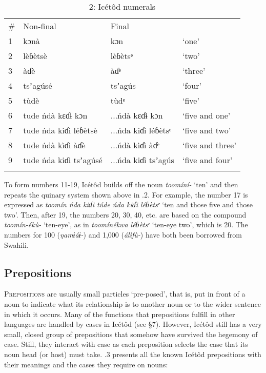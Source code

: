 \begin{table}
\caption{2: Icétôd numerals}
\label{tab:3}


\begin{tabularx}{\textwidth}{XXXX}
\lsptoprule

\# & Non-final & Final & \\
1 & kɔnà & kɔn & ‘one’\\
2 & lèɓètsè & lèɓètsᵉ & ‘two’\\
3 & àɗè & àɗᵉ & ‘three’\\
4 & tsʼagúsé & tsʼagús & ‘four’\\
5 & tùdè & tùdᵉ & ‘five’\\
6 & tude ńdà kɛɗɨ kɔn & ...ńdà kɛɗɨ kɔn & ‘five and one’\\
7 & tude ńda kiɗi léɓètsè & ...ńda kiɗi léɓètsᵉ & ‘five and two’\\
8 & tude ńdà kìɗì àɗè & ...ńdà kìɗì àɗᵉ & ‘five and three’\\
9 & tude ńda kiɗi tsʼagúsé & ...ńda kiɗi tsʼagús & ‘five and four’\\
\lspbottomrule
\end{tabularx}
\end{table}
To form numbers 11-19, Icétôd builds off the noun \textit{toomíní- }‘ten’ and then repeats the quinary system shown above in .2. For example, the number 17 is expressed as \textit{toomín ńda kiɗi túde ńda kiɗi léɓètsᵉ }‘ten and those five and those two’. Then, after 19, the numbers 20, 30, 40, etc. are based on the compound \textit{toomín-ékù- }‘ten-eye’, as in \textit{toomínékwa léɓètsᵉ }‘ten-eye two’, which is 20. The numbers for 100 (\textit{ŋamɨáɨ-}) and 1,000 (\textit{álìfù-}) have both been borrowed from Swahili.
 
\subsection{Prepositions}


\textsc{Prepositions} are usually small particles ‘pre-posed’, that is, put in front of a noun to indicate what its relationship is to another noun or to the wider sentence in which it occurs. Many of the functions that prepositions fulfill in other languages are handled by cases in Icétôd (see §7). However, Icétôd still has a very small, closed group of prepositions that somehow have survived the hegemony of case. Still, they interact with case as each preposition selects the case that its noun head (or host) must take. .3 presents all the known Icétôd prepositions with their meanings and the cases they require on nouns:


